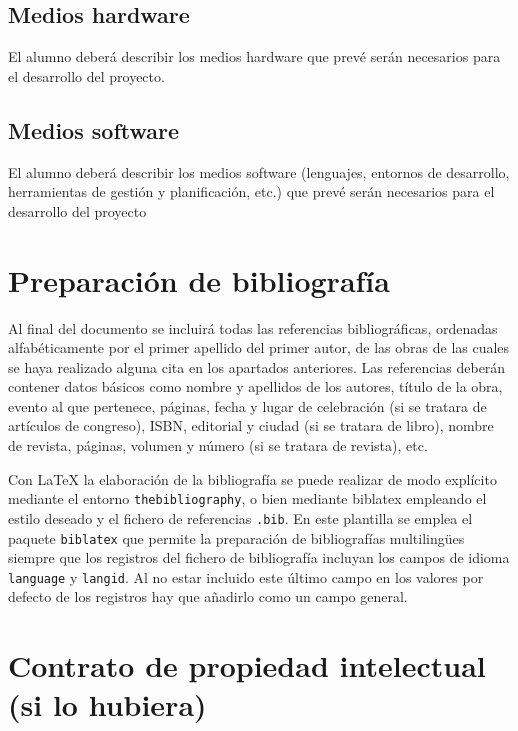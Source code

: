 \documentclass[11pt,a4paper,twoside,final]{article}
\begin{document}
\subsection{Medios hardware}
El alumno deberá describir los medios hardware que prevé serán necesarios para el desarrollo del proyecto.

\subsection{Medios software}
El alumno deberá describir los medios software (lenguajes, entornos de desarrollo, herramientas de gestión y planificación, etc.) que prevé serán necesarios para el desarrollo del proyecto









\section{Preparación de bibliografía}
Al final del documento se incluirá todas las referencias bibliográficas, ordenadas alfabéticamente por el primer apellido del primer autor, de las obras de las cuales se haya realizado alguna cita en los apartados anteriores. Las referencias deberán contener datos básicos como nombre y apellidos de los autores, título de la obra, evento al que pertenece, páginas, fecha y lugar de celebración (si se
tratara de artículos de congreso), ISBN, editorial y ciudad (si se tratara de libro), nombre de revista, páginas, volumen y número (si se tratara de revista), etc.

Con \LaTeX{} la elaboración de la bibliografía se puede realizar de modo explícito mediante el entorno \texttt{thebibliography}, o bien mediante \textsf{biblatex} empleando el estilo deseado y el fichero de referencias \texttt{\mbox{.bib}}. En este plantilla se emplea el paquete \texttt{biblatex} que permite la preparación de bibliografías multilingües siempre que los registros del fichero de bibliografía incluyan los campos de idioma \texttt{language} y \texttt{langid}. Al no estar incluido este último campo en los valores por defecto de los registros hay que añadirlo como un campo general.



\nocite{*} %
\printbibliography[title=Bibliografía]

\section{Contrato de propiedad intelectual (si lo hubiera)}
\end{document}
